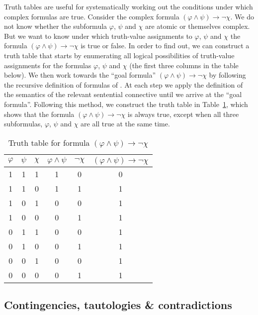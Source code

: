 \documentclass[nobib,nofonts]{tufte-handout}
\newcommand{\proplog}{\acro{PropLog}}
\begin{document}
Truth tables are useful for systematically working out the conditions under which complex formulas are true.
Consider the complex formula $(\varphi \wedge \psi) \rightarrow \neg \chi$.
We do not know whether the subformula $\varphi$, $\psi$ and $\chi$ are atomic or themselves complex.
But we want to know under which truth-value assignments to $\varphi$, $\psi$ and $\chi$ the formula $(\varphi \wedge \psi) \rightarrow \neg \chi$ is true or false.
In order to find out, we can construct a truth table that starts by enumerating all logical possibilities of truth-value assignments for the formulas $\varphi$, $\psi$ and $\chi$ (the first three columns in the table below).
We then work towards the ``goal formula'' $(\varphi \wedge \psi) \rightarrow \neg \chi$ by following the recursive definition of formulas of \mbox{\proplog}.
At each step we apply the definition of the semantics of the relevant sentential connective until we arrive at the ``goal formula''.
Following this method, we construct the truth table in Table~\ref{tab:truth-table-contingency}, which shows that the formula $(\varphi \wedge \psi) \rightarrow \neg \chi$ is always true, except when all three subformulas, $\varphi$, $\psi$ and $\chi$ are all true at the same time.

\begin{table}
  \centering
  \begin{center}
    \begin{tabular}{cccccc}
      $\varphi$ & $\psi$ & $\chi$ & $\varphi \wedge \psi$ & $\neg \chi$ & $(\varphi \wedge \psi) \rightarrow \neg \chi$ \\ \midrule
      1  & 1 & 1 & 1 & 0 & 0 \\
      1  & 1 & 0 & 1 & 1 & 1 \\
      1  & 0 & 1 & 0 & 0 & 1 \\
      1  & 0 & 0 & 0 & 1 & 1 \\
      0  & 1 & 1 & 0 & 0 & 1 \\
      0  & 1 & 0 & 0 & 1 & 1 \\
      0  & 0 & 1 & 0 & 0 & 1 \\
      0  & 0 & 0 & 0 & 1 & 1 \\
    \end{tabular}
  \end{center}

  \caption{Truth table for formula $(\varphi \wedge \psi) \rightarrow \neg \chi$}
  \label{tab:truth-table-contingency}
\end{table}

\subsection{Contingencies, tautologies \& contradictions}
\label{sec:cont-taut-}
\end{document}

